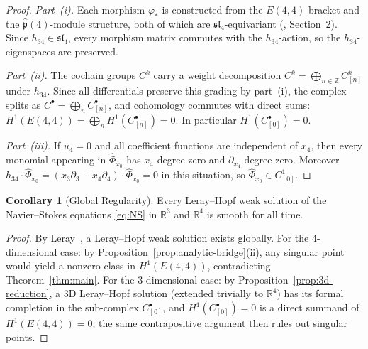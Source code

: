 \documentclass[reqno,10pt]{amsart}
\theoremstyle{definition}
\newtheorem{cor}[subsubsection]{Corollary}
\begin{document}
\begin{proof}
\textit{Part~(i).}
Each morphism $\varphi_*$ is constructed from the $E(4,4)$ bracket and the
$\hat{\mathfrak{p}}(4)$-module structure, both of which are
$\mathfrak{sl}_4$-equivariant (\cite{CCK2026}, Section~2).  Since
$h_{34}\in\mathfrak{sl}_4$, every morphism matrix commutes with the
$h_{34}$-action, so the $h_{34}$-eigenspaces are preserved.

\textit{Part~(ii).}
The cochain groups $C^k$ carry a weight decomposition
$C^k = \bigoplus_{n\in\mathbb{Z}} C^k_{[n]}$ under $h_{34}$.
Since all differentials preserve this grading by part~(i), the complex
splits as $C^\bullet = \bigoplus_n C^\bullet_{[n]}$, and cohomology
commutes with direct sums:
$H^1(E(4,4)) = \bigoplus_n H^1(C^\bullet_{[n]}) = 0$.
In particular $H^1(C^\bullet_{[0]}) = 0$.

\textit{Part~(iii).}
If $u_4=0$ and all coefficient functions are independent of $x_4$, then
every monomial appearing in $\widehat{\Phi}_{x_0}$ has $x_4$-degree zero
and $\partial_{x_4}$-degree zero.  Moreover
$h_{34}\cdot\widehat{\Phi}_{x_0} = (x_3\partial_3 - x_4\partial_4)\cdot
\widehat{\Phi}_{x_0} = 0$ in this situation, so
$\widehat{\Phi}_{x_0}\in C^1_{[0]}$.
\end{proof}

\begin{cor}[Global Regularity]\label{cor:regularity}
Every Leray--Hopf weak solution of the Navier--Stokes equations
\eqref{eq:NS} in $\mathbb{R}^3$ and $\mathbb{R}^4$ is smooth for all time.
\end{cor}

\begin{proof}
By Leray~\cite{Leray1934}, a Leray--Hopf weak solution exists globally.
For the 4-dimensional case: by Proposition~\ref{prop:analytic-bridge}(ii),
any singular point would yield a nonzero class in $H^1(E(4,4))$, contradicting
Theorem~\ref{thm:main}.
For the 3-dimensional case: by Proposition~\ref{prop:3d-reduction}, a 3D
Leray--Hopf solution (extended trivially to $\mathbb{R}^4$) has its formal
completion in the sub-complex $C^\bullet_{[0]}$, and
$H^1(C^\bullet_{[0]})=0$ is a direct summand of $H^1(E(4,4))=0$;
the same contrapositive argument then rules out singular points.
\end{proof}
\end{document}
